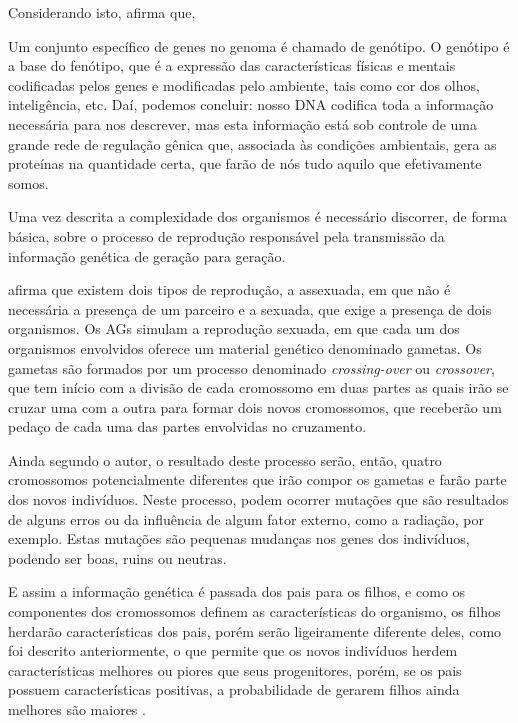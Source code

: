 \par Considerando isto,  afirma que,

\begin{citacao}
	Um conjunto específico de genes no genoma é chamado de genótipo. O
	genótipo é a base do fenótipo, que é a expressão das características
	físicas e mentais codificadas pelos genes e modificadas pelo
	ambiente, tais como cor dos olhos, inteligência, etc. Daí, podemos concluir: nosso
	DNA codifica toda a informação necessária para nos descrever, mas esta
	informação está sob controle de uma grande rede de regulação gênica
	que, associada às condições ambientais, gera as proteínas na quantidade
	certa, que farão de nós tudo aquilo que efetivamente
	somos.
\end{citacao}  

\par Uma vez descrita a complexidade dos organismos é necessário discorrer,
de forma básica, sobre o processo de reprodução responsável pela
transmissão da informação genética de geração para geração.

\par {} afirma que existem dois tipos de reprodução,
a assexuada, em que não é necessária a presença de um parceiro e a sexuada, que exige a
presença de dois organismos.
Os AGs simulam a reprodução sexuada, em que cada um dos organismos envolvidos
oferece um material genético denominado gametas. Os gametas são formados por um
processo denominado \textit{crossing-over} ou \textit{crossover}, que tem início com a 
divisão de cada cromossomo em duas partes as quais irão se cruzar uma com a outra para 
formar dois novos cromossomos, que receberão um pedaço de cada uma das partes envolvidas no cruzamento.

\par Ainda segundo o autor, o resultado deste processo serão, então, quatro
cromossomos potencialmente diferentes que irão compor os gametas e farão parte
dos novos indivíduos. Neste processo, podem ocorrer mutações que são resultados
de alguns erros ou da influência de algum fator externo, como a radiação, por exemplo. Estas mutações são
pequenas mudanças nos genes dos indivíduos, podendo ser boas, ruins ou neutras.


\par E assim a informação genética é passada dos pais para os filhos, e como os
componentes dos cromossomos definem as características do organismo, os filhos
herdarão características dos pais, porém serão ligeiramente diferente deles,
como foi descrito anteriormente, o que permite que os novos indivíduos herdem
características melhores ou piores que seus progenitores, porém, se os pais
possuem características positivas, a probabilidade de gerarem filhos ainda
melhores são maiores \cite{livro_ags_ricardo_linden}.

